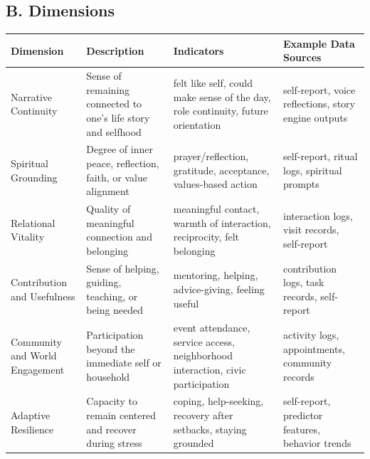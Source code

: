 \documentclass[
  journal,
]{IEEEtran}%
\newcounter{none} %
\begin{document}
\subsection{B. Dimensions}\label{b.-dimensions}

{\def\LTcaptype{none} %
\begin{longtable}[]{@{}
  >{\raggedright\arraybackslash}p{}
  >{\raggedright\arraybackslash}p{}
  >{\raggedright\arraybackslash}p{}
  >{\raggedright\arraybackslash}p{}@{}}
\toprule\noalign{}
\begin{minipage}[b]{\linewidth}\raggedright
Dimension
\end{minipage} & \begin{minipage}[b]{\linewidth}\raggedright
Description
\end{minipage} & \begin{minipage}[b]{\linewidth}\raggedright
Indicators
\end{minipage} & \begin{minipage}[b]{\linewidth}\raggedright
Example Data Sources
\end{minipage} \\
\midrule\noalign{}
\endhead
\bottomrule\noalign{}
\endlastfoot
Narrative Continuity & Sense of remaining connected to one's life story
and selfhood & felt like self, could make sense of the day, role
continuity, future orientation & self-report, voice reflections, story
engine outputs \\
Spiritual Grounding & Degree of inner peace, reflection, faith, or value
alignment & prayer/reflection, gratitude, acceptance, values-based
action & self-report, ritual logs, spiritual prompts \\
Relational Vitality & Quality of meaningful connection and belonging &
meaningful contact, warmth of interaction, reciprocity, felt belonging &
interaction logs, visit records, self-report \\
Contribution and Usefulness & Sense of helping, guiding, teaching, or
being needed & mentoring, helping, advice-giving, feeling useful &
contribution logs, task records, self-report \\
Community and World Engagement & Participation beyond the immediate self
or household & event attendance, service access, neighborhood
interaction, civic participation & activity logs, appointments,
community records \\
Adaptive Resilience & Capacity to remain centered and recover during
stress & coping, help-seeking, recovery after setbacks, staying grounded
& self-report, predictor features, behavior trends \\
\end{longtable}
}
\end{document}
